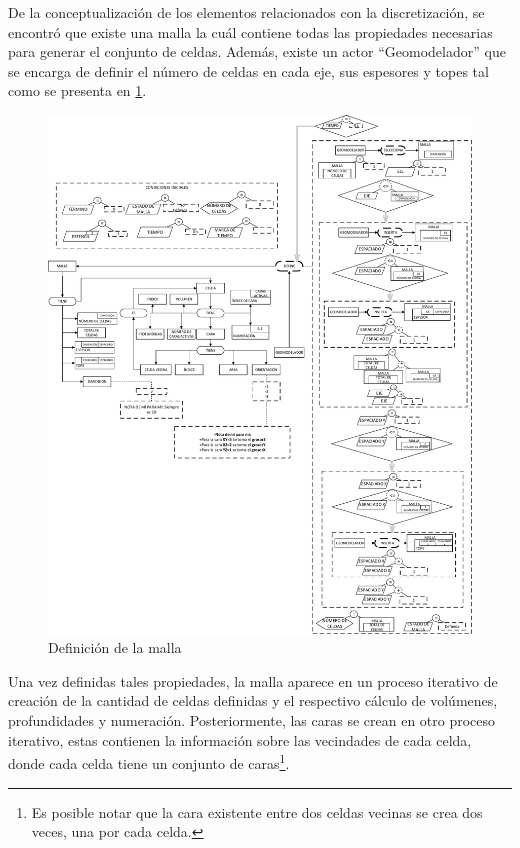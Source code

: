 De la conceptualización de los elementos relacionados con la discretización, se encontró que existe una malla la cuál contiene todas las propiedades necesarias para generar el conjunto de celdas. Además, existe un actor ``Geomodelador'' que se encarga de definir el número de celdas en cada eje, sus espesores y topes tal como se presenta en \ref{fig:Mesh}. \\
\begin{figure}[h]
	\centering%
	\includegraphics[width=0.9\linewidth]{Kap4/Mesh.pdf}%
	\caption{Definición de la malla} \label{fig:Mesh}
\end{figure}
Una vez definidas tales propiedades, la malla aparece en un proceso iterativo de creación de la cantidad de celdas definidas y el respectivo cálculo de volúmenes, profundidades y numeración. Posteriormente, las caras se crean en otro proceso iterativo, estas contienen la información sobre las vecindades de cada celda, donde cada celda tiene un conjunto de caras\footnote{Es posible notar que la cara existente entre dos celdas vecinas se crea dos veces, una por cada celda.}. 


